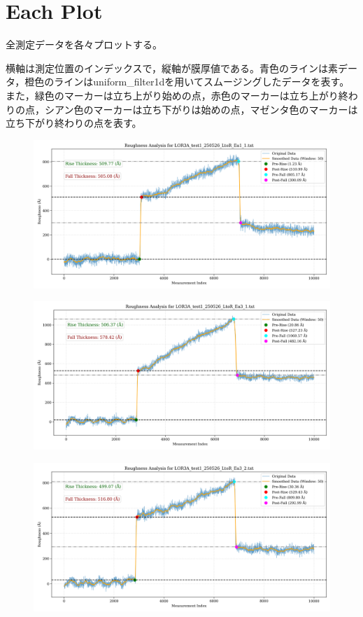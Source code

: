 \documentclass[platex,dvipdfmx,10pt,twoside,a4paper,jis2004]{jsarticle}
\begin{document}
\section*{Each Plot}
全測定データを各々プロットする。
\par
横軸は測定位置のインデックスで，縦軸が膜厚値である。青色のラインは素データ，橙色のラインはuniform\_filter1dを用いてスムージングしたデータを表す。また，緑色のマーカーは立ち上がり始めの点，赤色のマーカーは立ち上がり終わりの点，シアン色のマーカーは立ち下がりは始めの点，マゼンタ色のマーカーは立ち下がり終わりの点を表す。
\begin{figure}[H]
    \centering
    \includegraphics[width=\textwidth]{LOR3A_test1_250526_LtoR_Ea1_1.png}
    \label{fig:LOR3Atest1250526LtoREa11}
\end{figure}
\begin{figure}[H]
    \centering
    \includegraphics[width=\textwidth]{LOR3A_test1_250526_LtoR_Ea3_1.png}
    \label{fig:LOR3Atest1250526LtoREa31}
\end{figure}
\begin{figure}[H]
    \centering
    \includegraphics[width=\textwidth]{LOR3A_test1_250526_LtoR_Ea3_2.png}
    \label{fig:LOR3Atest1250526LtoREa32}
\end{figure}
\end{document}
